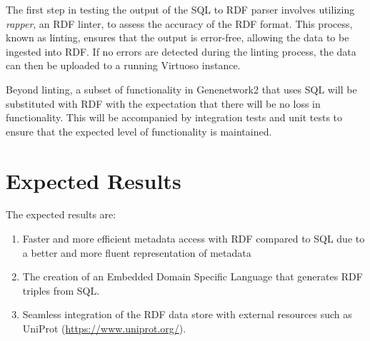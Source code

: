 The first step in testing the output of the SQL to RDF parser involves utilizing \textit{rapper}, an RDF linter, to assess the accuracy of the RDF format.  This process, known as linting, ensures that the output is error-free, allowing the data to be ingested into RDF.  If no errors are detected during the linting process, the data can then be uploaded to a running Virtuoso instance.

Beyond linting, a subset of functionality in Genenetwork2 that uses SQL will be substituted with RDF with the expectation that there will be no loss in functionality.  This will be accompanied by integration tests and unit tests to ensure that the expected level of functionality is maintained.

\section{Expected Results}
The expected results are:

\begin{enumerate}

\item Faster and more efficient metadata access with RDF compared to SQL due to a better and more fluent representation of metadata

\item The creation of an Embedded Domain Specific Language that generates RDF triples from SQL.

\item Seamless integration of the RDF data store with external resources such as UniProt (\url{https://www.uniprot.org/}).
\end{enumerate}
